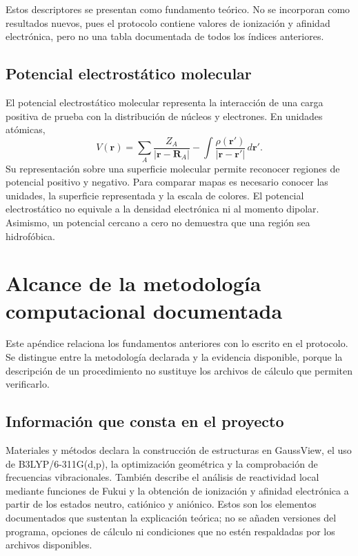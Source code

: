 \documentclass[12 pt, letter, oneside]{book}
\begin{document}
Estos descriptores se presentan como fundamento teórico. No se incorporan como resultados nuevos, pues el protocolo contiene valores de ionización y afinidad electrónica, pero no una tabla documentada de todos los índices anteriores.

\section{Potencial electrostático molecular}
El potencial electrostático molecular representa la interacción de una carga positiva de prueba con la distribución de núcleos y electrones. En unidades atómicas,
\begin{equation}
 V(\mathbf r)=\sum_A\frac{Z_A}{|\mathbf r-\mathbf R_A|}
 -\int\frac{\rho(\mathbf r')}{|\mathbf r-\mathbf r'|}\,d\mathbf r'.
\end{equation}
Su representación sobre una superficie molecular permite reconocer regiones de potencial positivo y negativo. Para comparar mapas es necesario conocer las unidades, la superficie representada y la escala de colores. El potencial electrostático no equivale a la densidad electrónica ni al momento dipolar. Asimismo, un potencial cercano a cero no demuestra que una región sea hidrofóbica.

\chapter{Alcance de la metodología computacional documentada}
\label{ap:documentacion}

Este apéndice relaciona los fundamentos anteriores con lo escrito en el protocolo. Se distingue entre la metodología declarada y la evidencia disponible, porque la descripción de un procedimiento no sustituye los archivos de cálculo que permiten verificarlo.

\section{Información que consta en el proyecto}
Materiales y métodos declara la construcción de estructuras en GaussView, el uso de B3LYP/6-311G(d,p), la optimización geométrica y la comprobación de frecuencias vibracionales. También describe el análisis de reactividad local mediante funciones de Fukui y la obtención de ionización y afinidad electrónica a partir de los estados neutro, catiónico y aniónico. Estos son los elementos documentados que sustentan la explicación teórica; no se añaden versiones del programa, opciones de cálculo ni condiciones que no estén respaldadas por los archivos disponibles.
\end{document}
